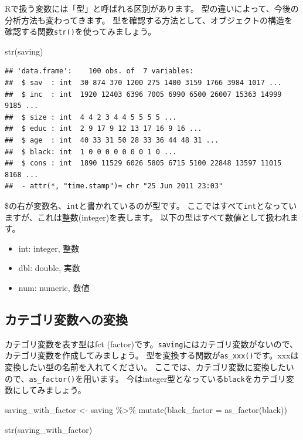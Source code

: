 \documentclass[
]{book}
\newenvironment{Shaded}{\begin{snugshade}}{\end{snugshade}}
\newcommand{\AttributeTok}[1]{\textcolor[rgb]{0.77,0.63,0.00}{#1}}
\newcommand{\FunctionTok}[1]{\textcolor[rgb]{0.00,0.00,0.00}{#1}}
\newcommand{\NormalTok}[1]{#1}
\newcommand{\OtherTok}[1]{\textcolor[rgb]{0.56,0.35,0.01}{#1}}
\newcommand{\SpecialCharTok}[1]{\textcolor[rgb]{0.00,0.00,0.00}{#1}}
\providecommand{\tightlist}{%
  \setlength{\itemsep}{0pt}\setlength{\parskip}{0pt}}
\begin{document}
Rで扱う変数には「型」と呼ばれる区別があります。
型の違いによって、今後の分析方法も変わってきます。
型を確認する方法として、オブジェクトの構造を確認する関数\texttt{str()}を使ってみましょう。

\begin{Shaded}
\begin{Highlighting}[]
\FunctionTok{str}\NormalTok{(saving)}
\end{Highlighting}
\end{Shaded}

\begin{verbatim}
## 'data.frame':    100 obs. of  7 variables:
##  $ sav  : int  30 874 370 1200 275 1400 3159 1766 3984 1017 ...
##  $ inc  : int  1920 12403 6396 7005 6990 6500 26007 15363 14999 9185 ...
##  $ size : int  4 4 2 3 4 4 5 5 5 5 ...
##  $ educ : int  2 9 17 9 12 13 17 16 9 16 ...
##  $ age  : int  40 33 31 50 28 33 36 44 48 31 ...
##  $ black: int  1 0 0 0 0 0 0 0 1 0 ...
##  $ cons : int  1890 11529 6026 5805 6715 5100 22848 13597 11015 8168 ...
##  - attr(*, "time.stamp")= chr "25 Jun 2011 23:03"
\end{verbatim}

\$の右が変数名、\texttt{int}と書かれているのが型です。
ここではすべて\texttt{int}となっていますが、これは整数(integer)を表します。
以下の型はすべて数値として扱われます。

\begin{itemize}
\tightlist
\item
  int: integer, 整数
\item
  dbl: double, 実数
\item
  num: numeric, 数値
\end{itemize}

\hypertarget{ux30abux30c6ux30b4ux30eaux5909ux6570ux3078ux306eux5909ux63db}{%
\subsection{カテゴリ変数への変換}\label{ux30abux30c6ux30b4ux30eaux5909ux6570ux3078ux306eux5909ux63db}}

カテゴリ変数を表す型はfct (factor)です。\texttt{saving}にはカテゴリ変数がないので、カテゴリ変数を作成してみましょう。
型を変換する関数が\texttt{as\_xxx()}です。xxxは変換したい型の名前を入れてください。
ここでは、カテゴリ変数に変換したいので、\texttt{as\_factor()}を用います。
今はinteger型となっている\texttt{black}をカテゴリ変数にしてみましょう。

\begin{Shaded}
\begin{Highlighting}[]
\NormalTok{saving\_with\_factor }\OtherTok{\textless{}{-}}
\NormalTok{  saving }\SpecialCharTok{\%\textgreater{}\%}
    \FunctionTok{mutate}\NormalTok{(}\AttributeTok{black\_factor =} \FunctionTok{as\_factor}\NormalTok{(black))}

\FunctionTok{str}\NormalTok{(saving\_with\_factor)}
\end{Highlighting}
\end{Shaded}
\end{document}
